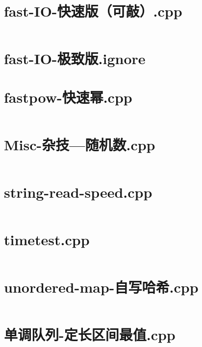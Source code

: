 \documentclass[a4paper,landscape,twocolumn]{book} %
\begin{document}
\section{fast-IO-快速版（可敲）.cpp}
\inputminted{c++}{./codes/039}
\section{fast-IO-极致版.ignore}
\section{fastpow-快速幂.cpp}
\inputminted{c++}{./codes/041}
\section{Misc-杂技---随机数.cpp}
\inputminted{c++}{./codes/042}
\section{string-read-speed.cpp}
\inputminted{c++}{./codes/043}
\section{timetest.cpp}
\inputminted{c++}{./codes/044}
\section{unordered-map-自写哈希.cpp}
\inputminted{c++}{./codes/045}
\section{单调队列-定长区间最值.cpp}
\inputminted{c++}{./codes/046}
\end{document}
